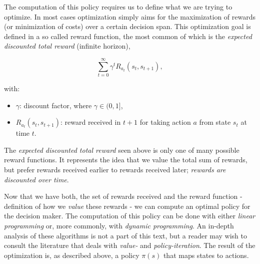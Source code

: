 The computation of this policy requires us to define what we are trying to optimize. In most cases optimization simply aims for the maximization of rewards (or minimization of costs) over a certain decision span. This optimization goal is defined in a so called reward function, the most common of which is the \textit{expected discounted total reward} (infinite horizon),

\[
\sum_{t=0}^{\infty} {\gamma}^{t}R_{a_t}(s_t,s_{t+1}),
\]

with:
\begin{itemize}
\item $\gamma$: discount factor, where $\gamma\in(0,1]$,
\item $R_{a_t}(s_t,s_{t+1})$: reward received in $t+1$ for taking action $a$ from state $s_t$ at time $t$.	
\end{itemize}

The \textit{expected discounted total reward} seen above is only one of many possible reward functions. It represents the idea that we value the total sum of rewards, but prefer rewards received earlier to rewards received later; \textit{rewards are discounted over time}.

Now that we have both, the set of rewards received and the reward function - definition of how we \textit{value} these rewards - we can compute an optimal policy for the decision maker. The computation of this policy can be done with either \textit{linear programming} or, more commonly, with \textit{dynamic programming}. An in-depth analysis of these algorithms is not a part of this text, but a reader may wish to consult the literature \cite{puterman} that deals with \textit{value-} and \textit{policy-iteration}. The result of the optimization is, as described above, a policy $\pi(s)$ that maps states to actions.